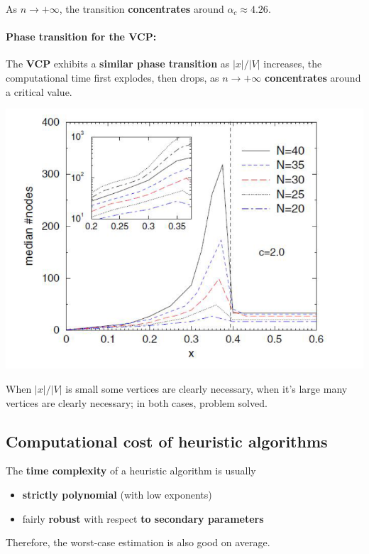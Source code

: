 \documentclass[11pt]{article}
\begin{document}
	As $n \rightarrow + \infty$, the transition \textbf{concentrates} around $\alpha_c \approx 4.26$.\\
	
	\newpage
	
	\paragraph{Phase transition for the VCP:} The \textbf{VCP} exhibits a \textbf{similar phase transition} as $|x|/|V|$ increases, the computational time first explodes, then drops, as $n \rightarrow +\infty$ \textbf{concentrates} around a critical value.
	\begin{center}
		\includegraphics[width=0.7\columnwidth]{img/PhaseT2}
	\end{center}
	When $|x|/|V|$ is small some vertices are clearly necessary, when it's large many vertices are clearly necessary; in both cases, problem solved.\\
	
	\vfill 
	
	\subsection*{Computational cost of heuristic algorithms}
	The \textbf{time complexity} of a heuristic algorithm is usually
	\begin{itemize}
		\item \textbf{strictly polynomial} (with low exponents)
		\item fairly \textbf{robust} with respect \textbf{to secondary parameters}
	\end{itemize}
	Therefore, the worst-case estimation is also good on average.\\
	
\end{document}
